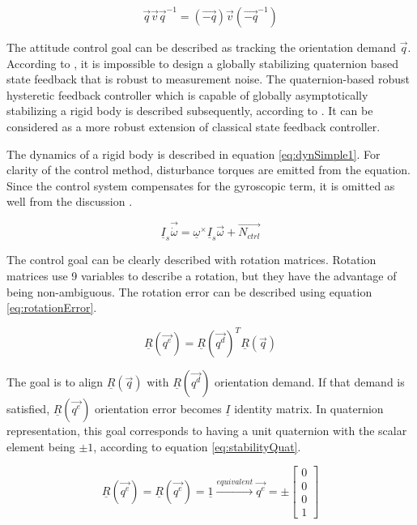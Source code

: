 \begin{equation}
\label{eq:doubleCover}
\vec{q} \vec{v} \vec{q}^{-1} = 	(\vec{-q}) \vec{v} (\vec{-q}^{-1})
\end{equation} 

The attitude control goal can be described as tracking the orientation demand $\vec{q}$. According to \cite{globalAttController}, it is impossible to design a globally stabilizing quaternion based state feedback that is robust to measurement noise. The quaternion-based robust hysteretic feedback controller which is capable of globally asymptotically stabilizing a rigid body is described subsequently, according to \cite{globalAttController}. It can be considered as a more robust extension of classical state feedback controller.


The dynamics of a rigid body is described in equation \ref{eq:dynSimple1}. For clarity of the control method, disturbance torques are emitted from the equation. Since the control system compensates for the gyroscopic term, it is omitted as well from the discussion .

\begin{equation}
\label{eq:dynSimple1}
\underline{I}_s \vec{\dot{\omega}} = \underline{\omega}^\times \underline{I}_s \vec{\omega} + \vec{N_{ctrl}}
\end{equation}

The control goal can be clearly described with rotation matrices. Rotation matrices use 9 variables to describe a rotation, but they have the advantage of being non-ambiguous. The rotation error can be described using equation \ref{eq:rotationError}. 

\begin{equation}
\label{eq:rotationError}
\underline{R}(\vec{q^e}) = \underline{R}(\vec{q^d})^T \underline{R}(\vec{q})
\end{equation}

The goal is to align $\underline{R}(\vec{q})$ with $\underline{R}(\vec{q^d})$ orientation demand. If that demand is satisfied, $\underline{{R}}(\vec{q^e})$ orientation error becomes $\underline{I}$ identity matrix. In quaternion representation, this goal corresponds to having a unit quaternion with the scalar element being $\pm 1$, according to equation \ref{eq:stabilityQuat}. 

\begin{equation}
\label{eq:stabilityQuat}
\underline{R}(\vec{q^e}) = \underline{R}(\vec{q^e}) = \underline{1} \xrightarrow{equivalent} \vec{q^e}  = \pm	\begin{bmatrix}
0 \\
0 \\
0 \\
1
\end{bmatrix} 	
\end{equation}

